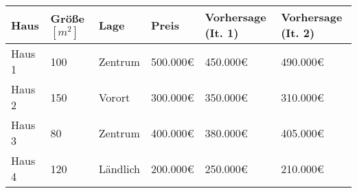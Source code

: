 \begin{tabularx}{\textwidth}{|X|X|X|X|X|X|}
    \hline
    \textbf{Haus} & \textbf{Größe $[m^2]$} & \textbf{Lage} & \textbf{Preis} & \textbf{Vorhersage (It. 1)} & \textbf{Vorhersage (It. 2)} \\
    \hline
    Haus 1        & 100                    & Zentrum       & 500.000€       & 450.000€                    & 490.000€                    \\
    \hline
    Haus 2        & 150                    & Vorort        & 300.000€       & 350.000€                    & 310.000€                    \\
    \hline
    Haus 3        & 80                     & Zentrum       & 400.000€       & 380.000€                    & 405.000€                    \\
    \hline
    Haus 4        & 120                    & Ländlich      & 200.000€       & 250.000€                    & 210.000€                    \\
    \hline
\end{tabularx}